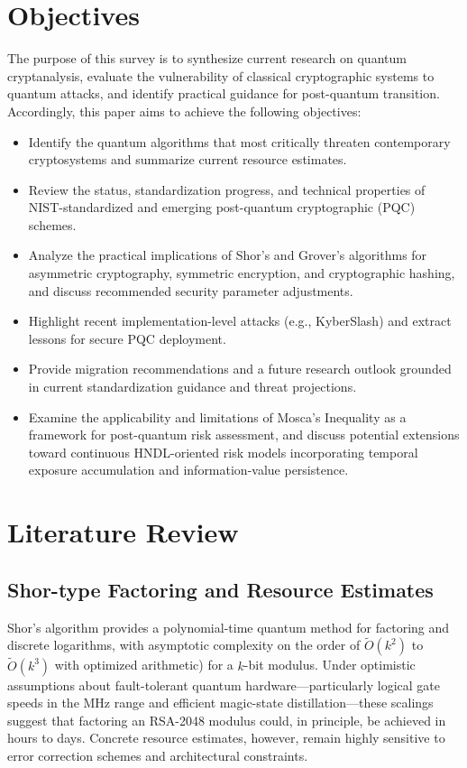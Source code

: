 \documentclass[11pt,a4paper]{article}
\begin{document}
\section{Objectives}

The purpose of this survey is to synthesize current research on quantum cryptanalysis, evaluate the vulnerability of classical cryptographic systems to quantum attacks, and identify practical guidance for post-quantum transition. Accordingly, this paper aims to achieve the following objectives:

\begin{itemize}[leftmargin=*]

  \item Identify the quantum algorithms that most critically threaten contemporary cryptosystems and summarize current resource estimates.

  \item Review the status, standardization progress, and technical properties of NIST-standardized and emerging post-quantum cryptographic (PQC) schemes.

  \item Analyze the practical implications of Shor’s and Grover’s algorithms for asymmetric cryptography, symmetric encryption, and cryptographic hashing, and discuss recommended security parameter adjustments.

  \item Highlight recent implementation-level attacks (e.g., KyberSlash) and extract lessons for secure PQC deployment.

  \item Provide migration recommendations and a future research outlook grounded in current standardization guidance and threat projections.

  \item Examine the applicability and limitations of Mosca’s Inequality as a framework for post-quantum risk assessment, and discuss potential extensions toward continuous HNDL-oriented risk models incorporating temporal exposure accumulation and information-value persistence.

\end{itemize}

\section{Literature Review}
\subsection{Shor-type Factoring and Resource Estimates}
Shor’s algorithm\cite{shor1997} provides a polynomial-time quantum method for factoring and discrete logarithms, with asymptotic complexity on the order of $\tilde{O}(k^2)$ to $\tilde{O}(k^3)$ with optimized arithmetic) for a $k$-bit modulus. Under optimistic assumptions about fault-tolerant quantum hardware—particularly logical gate speeds in the MHz range and efficient magic-state distillation—these scalings suggest that factoring an RSA-2048 modulus could, in principle, be achieved in hours to days.
Concrete resource estimates, however, remain highly sensitive to error correction schemes and architectural constraints.
\end{document}
